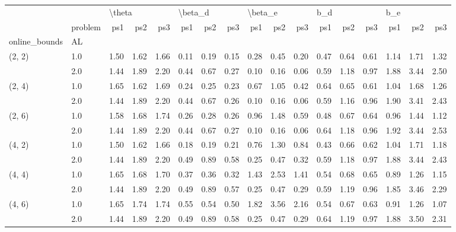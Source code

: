 \begin{tabular}{llrrrrrrrrrrrrrrr}
\toprule
       & {} & \multicolumn{3}{l}{\textbackslash theta} & \multicolumn{3}{l}{\textbackslash beta\_d} & \multicolumn{3}{l}{\textbackslash beta\_e} & \multicolumn{3}{l}{b\_d} & \multicolumn{3}{l}{b\_e} \\
       & problem &    ps1 &  ps2 &  ps3 &     ps1 &  ps2 &  ps3 &     ps1 &  ps2 &  ps3 &  ps1 &  ps2 &  ps3 &  ps1 &  ps2 &  ps3 \\
online\_bounds & AL &        &      &      &         &      &      &         &      &      &      &      &      &      &      &      \\
\midrule
(2, 2) & 1.0 &   1.50 & 1.62 & 1.66 &    0.11 & 0.19 & 0.15 &    0.28 & 0.45 & 0.20 & 0.47 & 0.64 & 0.61 & 1.14 & 1.71 & 1.32 \\
       & 2.0 &   1.44 & 1.89 & 2.20 &    0.44 & 0.67 & 0.27 &    0.10 & 0.16 & 0.06 & 0.59 & 1.18 & 0.97 & 1.88 & 3.44 & 2.50 \\
(2, 4) & 1.0 &   1.65 & 1.62 & 1.69 &    0.24 & 0.25 & 0.23 &    0.67 & 1.05 & 0.42 & 0.64 & 0.65 & 0.61 & 1.04 & 1.68 & 1.26 \\
       & 2.0 &   1.44 & 1.89 & 2.20 &    0.44 & 0.67 & 0.26 &    0.10 & 0.16 & 0.06 & 0.59 & 1.16 & 0.96 & 1.90 & 3.41 & 2.43 \\
(2, 6) & 1.0 &   1.58 & 1.68 & 1.74 &    0.26 & 0.28 & 0.26 &    0.96 & 1.48 & 0.59 & 0.48 & 0.67 & 0.64 & 0.96 & 1.44 & 1.12 \\
       & 2.0 &   1.44 & 1.89 & 2.20 &    0.44 & 0.67 & 0.27 &    0.10 & 0.16 & 0.06 & 0.64 & 1.18 & 0.96 & 1.92 & 3.44 & 2.53 \\
(4, 2) & 1.0 &   1.50 & 1.62 & 1.66 &    0.18 & 0.19 & 0.21 &    0.76 & 1.30 & 0.84 & 0.43 & 0.66 & 0.62 & 1.04 & 1.71 & 1.18 \\
       & 2.0 &   1.44 & 1.89 & 2.20 &    0.49 & 0.89 & 0.58 &    0.25 & 0.47 & 0.32 & 0.59 & 1.18 & 0.97 & 1.88 & 3.44 & 2.43 \\
(4, 4) & 1.0 &   1.65 & 1.68 & 1.70 &    0.37 & 0.36 & 0.32 &    1.43 & 2.53 & 1.41 & 0.54 & 0.68 & 0.65 & 0.89 & 1.26 & 1.15 \\
       & 2.0 &   1.44 & 1.89 & 2.20 &    0.49 & 0.89 & 0.57 &    0.25 & 0.47 & 0.29 & 0.59 & 1.19 & 0.96 & 1.85 & 3.46 & 2.29 \\
(4, 6) & 1.0 &   1.65 & 1.74 & 1.74 &    0.55 & 0.54 & 0.50 &    1.82 & 3.56 & 2.16 & 0.54 & 0.67 & 0.63 & 0.91 & 1.26 & 1.07 \\
       & 2.0 &   1.44 & 1.89 & 2.20 &    0.49 & 0.89 & 0.58 &    0.25 & 0.47 & 0.29 & 0.64 & 1.19 & 0.97 & 1.88 & 3.50 & 2.31 \\

\end{tabular}
